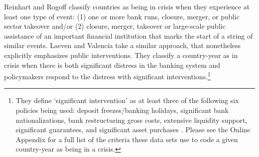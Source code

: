 \documentclass[]{article}
\begin{document}
Reinhart and Rogoff \citeyearpar[10]{Reinhart2009,ReinhartRog2010} classify countries as being in crisis when they experience at least one type of event: (1) one or more bank runs, closure, merger, or public sector takeover and/or (2) closure, merger, takeover or large-scale public assistance of an important financial institution that marks the start of a string of similar events. Laeven and Valencia \citeyearpar[228]{laeven2013} take a similar approach, that nonetheless explicitly emphasizes public interventions. They classify a country-year as in crisis when there is both significant distress in the banking system and policymakers respond to the distress with significant interventions.\footnote{They define `significant intervention' as at least three of the following six policies being used: deposit freezes/banking holidays, significant bank nationalizations, bank restructuring gross costs, extensive liquidity support, significant guarantees, and significant asset purchases \cite[][229]{laeven2013}. Please see the Online Appendix for a full list of the criteria these data sets use to code a given country-year as being in a crisis.}
\end{document}
